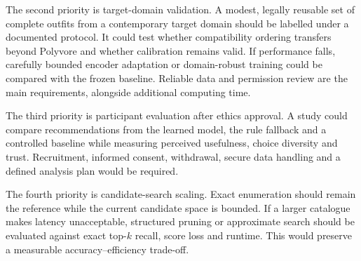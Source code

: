 The second priority is target-domain validation. A modest, legally reusable
set of complete outfits from a contemporary target domain should be labelled
under a documented protocol. It could test whether compatibility ordering
transfers beyond Polyvore and whether calibration remains valid. If
performance falls, carefully bounded encoder adaptation or domain-robust
training could be compared with the frozen baseline. Reliable data and
permission review are the main requirements, alongside additional computing
time.

The third priority is participant evaluation after ethics approval. A study
could compare recommendations from the learned model, the rule fallback and a
controlled baseline while measuring perceived usefulness, choice diversity
and trust. Recruitment, informed consent, withdrawal, secure data handling and
a defined analysis plan would be required.

The fourth priority is candidate-search scaling. Exact enumeration should
remain the reference while the current candidate space is bounded. If a larger
catalogue makes latency unacceptable, structured pruning or approximate search
should be evaluated against exact top-$k$ recall, score loss and runtime. This
would preserve a measurable accuracy--efficiency trade-off.
